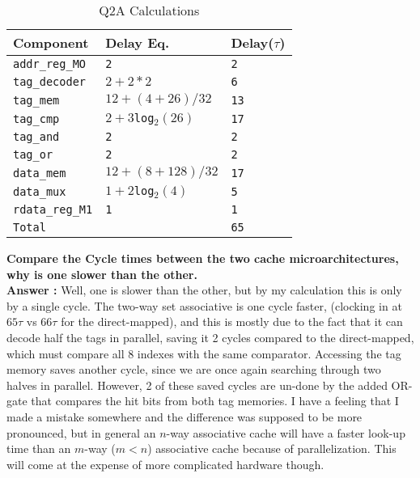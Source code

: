 \documentclass[a4paper,11pt]{article}
\newcommand{\answer}{\textbf{Answer : }}
\newcommand{\T}{\texttt}
\newcommand{\V}{\verb}
\begin{document}
\begin{table}[H]
\caption{Q2A Calculations} \label{tab:q2Atable} 
\begin{center}
\begin{tabular}{| l | l | l |}
\hline
  Component         &  Delay Eq.              & Delay($\tau$)          \\ \hline
  \V.addr_reg_MO.   &   \T{2}                 & \T{2}                  \\ \hline
  \V.tag_decoder.   &   \T{$2+2*2$}           & \T{6}                  \\ \hline
  \V.tag_mem.       &   \T{$12+(4+26)/32$}    & \T{13}                 \\ \hline
  \V.tag_cmp.       &   \T{$2+3$log$_2(26)$}  & \T{17}                 \\ \hline
  \V.tag_and.       &   \T{2}                 & \T{2}                  \\ \hline
  \V.tag_or.        &   \T{2}                 & \T{2}                  \\ \hline
  \V.data_mem.      &   \T{$12+(8+128)/32$}   & \T{17}                 \\ \hline
  \V.data_mux.      &   \T{$1+2$log$_2(4)$}   & \T{5}                  \\ \hline
  \V.rdata_reg_M1.  &   \T{1}                 & \T{1}                  \\ \hline \hline
  \V.Total.         &   \T{}                  & \T{65}                 \\ \hline
\end{tabular}
\end{center}
\end{table}


\textbf{Compare the Cycle times between the two cache microarchitectures, why is one slower than the other.} \\
\answer Well, one is slower than the other, but by my calculation this is only by a single cycle. The two-way set associative is one cycle faster, (clocking in at $65\tau$ vs $66\tau$ for the direct-mapped), and this is mostly due to the fact that it can decode half the tags in parallel, saving it 2 cycles compared to the direct-mapped, which must compare all 8 indexes with the same comparator. Accessing the tag memory saves another cycle, since we are once again searching through two halves in parallel. However, 2 of these saved cycles are un-done by the added OR-gate that compares the hit bits from both tag memories. I have a feeling that I made a mistake somewhere and the difference was supposed to be more pronounced, but in general an $n$-way associative cache will have a faster look-up time than an $m$-way ($m < n$) associative cache because of parallelization. This will come at the expense of more complicated hardware though. \\
\end{document}
